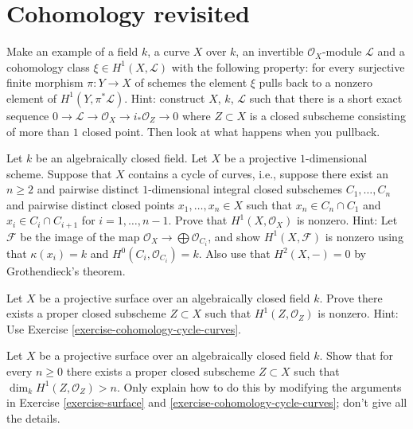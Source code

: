 \section{Cohomology revisited}
\label{section-more-more-cohomology}


\begin{exercise}
\label{exercise-nonkillable}
Make an example of a field $k$, a curve $X$ over $k$,
an invertible $\mathcal{O}_X$-module $\mathcal{L}$ and
a cohomology class $\xi \in H^1(X, \mathcal{L})$ with
the following property: for every surjective
finite morphism $\pi : Y \to X$ of schemes the element $\xi$
pulls back to a nonzero element of $H^1(Y, \pi^*\mathcal{L})$.
Hint: construct $X$, $k$, $\mathcal{L}$ such that
there is a short exact sequence
$0 \to \mathcal{L} \to \mathcal{O}_X \to i_*\mathcal{O}_Z \to 0$
where $Z \subset X$ is a closed subscheme consisting of
more than $1$ closed point. Then look at what happens when you
pullback.
\end{exercise}

\begin{exercise}
\label{exercise-cohomology-cycle-curves}
Let $k$ be an algebraically closed field.
Let $X$ be a projective $1$-dimensional scheme.
Suppose that $X$ contains a cycle of curves, i.e., suppose
there exist an $n \geq 2$ and pairwise distinct
$1$-dimensional integral closed subschemes
$C_1, \ldots, C_n$ and pairwise distinct closed points
$x_1, \ldots, x_n \in X$ such that $x_n \in C_n \cap C_1$
and $x_i \in C_i \cap C_{i + 1}$
for $i = 1, \ldots, n - 1$.
Prove that $H^1(X, \mathcal{O}_X)$ is nonzero.
Hint: Let $\mathcal{F}$ be the image of the map
$\mathcal{O}_X \to \bigoplus \mathcal{O}_{C_i}$,
and show $H^1(X, \mathcal{F})$ is nonzero
using that $\kappa(x_i) = k$ and $H^0(C_i, \mathcal{O}_{C_i}) = k$.
Also use that $H^2(X, -) = 0$ by Grothendieck's theorem.
\end{exercise}

\begin{exercise}
\label{exercise-surface}
Let $X$ be a projective surface over an algebraically closed field $k$.
Prove there exists a proper closed subscheme $Z \subset X$ such that
$H^1(Z, \mathcal{O}_Z)$ is nonzero. Hint: Use
Exercise \ref{exercise-cohomology-cycle-curves}.
\end{exercise}

\begin{exercise}
\label{exercise-surface-better}
Let $X$ be a projective surface over an algebraically closed field $k$.
Show that for every $n \geq 0$
there exists a proper closed subscheme $Z \subset X$ such that
$\dim_k H^1(Z, \mathcal{O}_Z) > n$.
Only explain how to do this by modifying the arguments
in Exercise \ref{exercise-surface} and
\ref{exercise-cohomology-cycle-curves}; don't give all the details.
\end{exercise}

